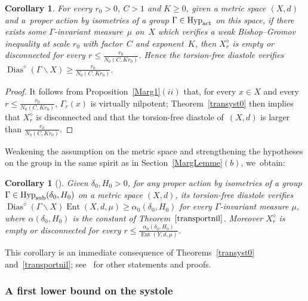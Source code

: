 \documentclass[10pt,a4paper]{amsart}
\numberwithin{equation}{section}
\newtheorem{Corollary}[theor]{Corollary}
\newcommand{\Ent}{\operatorname{Ent}}
\newcommand{\dias}{\operatorname{Dias}}
\begin{document}
\begin{Corollary}\label{transyst1}
For every $r_0 >0$, $C > 1 $ and $K\ge 0$, given a metric space $(X,d)$ and a~proper action by isometries of a group
$\Gamma \in \text{\rm Hyp}_{\rm act}$ on this space, if there exists some
$\Gamma$-invariant measure~$\mu$ on~$X$ which verifies a weak Bishop--Gromov inequality at scale $r_0$ with factor~$C$ and exponent~$K$, then $X^{\diamond}_{r}$ is empty or disconnected for every $r \le \frac{r_0}{N_0 (C, Kr_0)}$. Hence
the torsion-free diastole verifies $\dias^{\diamond} (\Gamma \backslash X) \ge \frac{r_0}{N_0 (C, Kr_0)}$.
\end{Corollary}

\begin{proof} It follows from Proposition~\ref{Marg1}$(ii)$ that, for every $x \in X$ and every $r \le \frac{r_0}{N_0 (C, Kr_0)}$, $\Gamma_{r} (x)$ is virtually
nilpotent; Theorem~\ref{transyst0} then implies that $X^{\diamond}_{r}$ is disconnected and that the torsion-free diastole of~$(X,d)$ is larger than
$\frac{r_0}{N_0 (C, Kr_0)} $.
\end{proof}

Weakening the assumption on the metric space and strengthening the hypotheses on the group in the same spirit as in Section~\ref{MargLemme}$(b)$, we~obtain:

\begin{Corollary}[{\cite[Theorem~6.15(ii)]{BCGS}}]\label{transyst2}
Given $\delta_0, H_0 > 0$, for any proper action by isometries of a group
$\Gamma \in \text{\rm Hyp}_{\rm sub} (\delta_0, H_0)$ on
a metric space $ (X, d) $, its torsion-free diastole verifies $\dias^{\diamond} (\Gamma \backslash X) \Ent (X, d, \mu) \ge \alpha_0 (\delta_0, H_0)$
for every $\Gamma$-invariant measure $\mu$, where $\alpha (\delta_0, H_0)$ is the constant of Theorem~$\ref{transportnil}$.
Moreover $X^{\diamond}_{r}$ is empty or disconnected for every $r \le \frac{\alpha_0 (\delta_0, H_0)}{\Ent (Y,d, \mu)}$.
\end{Corollary}
This corollary is an immediate consequence of Theorems~\ref{transyst0} and~\ref{transportnil}; see~\cite[Section~6.3]{BCGS} for other statements
and proofs.

\subsubsection{A first lower bound on the systole}\label{systolebound1}
\end{document}
